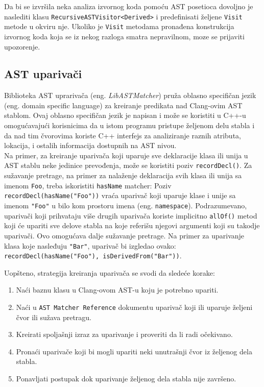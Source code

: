 \documentclass[12pt,oneside]{memoir}
\begin{document}
\par
Da bi se izvršila neka analiza izvornog koda pomoću AST posetioca dovoljno je naslediti klasu 
 \lstinline{RecursiveASTVisitor<Derived>} i predefinisati željene \lstinline{Visit} metode u okviru nje. Ukoliko je \lstinline{Visit} metodama pronađena konstrukcija izvornog koda koja se iz nekog razloga smatra nepravilnom, moze se prijaviti upozorenje.

\subsection{AST upariva\v{c}i}

Biblioteka AST uprariva\v{c}a (eng. \textit{LibASTMatcher}) pruža oblasno specifičan jezik (eng. domain specific language) za kreiranje predikata nad Clang-ovim AST stablom. Ovaj oblasno specifičan jezik je napisan i može se koristiti u C++-u omogućavajući korisnicima da u istom programu pristupe željenom delu stabla i da nad tim čvorovima koriste C++ interfejs za analiziranje raznih atributa, lokacija, i ostalih informacija dostupnih na AST nivou.
\\ Na primer, za kreiranje upariva\v{c}a koji uparuje sve deklaracije klasa ili unija u AST stablu neke jedinice prevođenja, može se koristiti poziv \lstinline{recordDecl()}. Za sužavanje pretrage, na primer za nalaženje deklaracija svih klasa ili unija sa imenom \lstinline{Foo}, treba iskoristiti \lstinline{hasName} matcher: Poziv \lstinline{recordDecl(hasName("Foo"))} vraća upariva\v{c} koji uparuje klase i unije sa imenom \lstinline{"Foo"} u bilo kom prostoru imena (eng. \lstinline{namespace}). Podrazumevano, upariva\v{c}i koji prihvataju više drugih upariva\v{c}a koriste implicitno \lstinline{allOf()} metod koji \'{c}e upariti sve delove stabla na koje referi\v{s}u njegovi argumenti koji su takodje upariva\v{c}i. Ovo omogućava dalje sužavanje pretrage. Na primer za uparivanje klasa koje nasleđuju \lstinline{"Bar"}, upariva\v{c} bi izgledao ovako: \lstinline{recordDecl(hasName("Foo"), isDerivedFrom("Bar"))}.
\par

Uopšteno, strategija kreiranja upariva\v{c}a se svodi da sledeće korake:
\begin{enumerate}
\item Na\'{c}i baznu klasu u Clang-ovom AST-u koju je potrebno upariti.
 
\item Na\'{c}i u \texttt{AST Matcher Reference} dokumentu upariva\v{c} koji ili uparuje \v{z}eljeni čvor ili su\v{z}ava pretragu.
\item Kreirati spoljašnji izraz za uparivanje i proveriti da li radi o\v{c}ekivano.
\item Prona\'{c}i upariva\v{c}e koji bi mogli upariti neki unutrašnji čvor iz željenog dela stabla.
\item Ponavljati postupak dok uparivanje željenog dela stabla nije završeno.
\end{enumerate}
\end{document}
